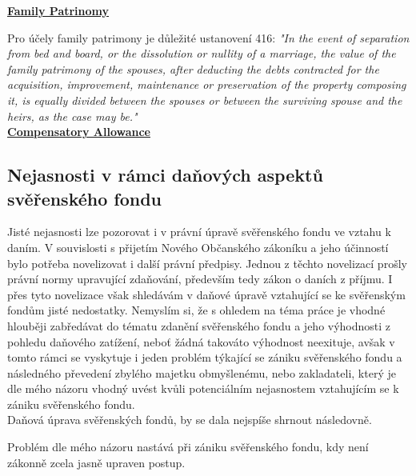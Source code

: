 \documentclass{article}
\begin{document}
\underline{\textbf{Family Patrinomy}}

Pro účely family patrimony je důležité ustanovení 416: \textit{"In the event of separation from bed and board, or the dissolution or nullity of a marriage, the value of the family patrimony of the spouses, after deducting the debts contracted for the acquisition, improvement, maintenance or preservation of the property composing it, is equally divided between the spouses or between the surviving spouse and the heirs, as the case may be."}\\

\underline{\textbf{Compensatory Allowance}}

\subsection{Nejasnosti v rámci daňových aspektů svěřenského fondu}


Jisté nejasnosti lze pozorovat i v právní úpravě svěřenského fondu ve vztahu k daním. V souvislosti s přijetím Nového Občanského zákoníku a jeho účinností bylo potřeba novelizovat i další právní předpisy. Jednou z těchto novelizací prošly právní normy upravující zdaňování, především tedy zákon o daních z příjmu. I přes tyto novelizace však shledávám v daňové úpravě vztahující se ke svěřenským fondům jisté nedostatky. Nemyslím si, že s ohledem na téma práce je vhodné hlouběji zabředávat do tématu zdanění svěřenského fondu a jeho výhodnosti z pohledu daňového zatížení, neboť žádná takováto výhodnost neexituje, avšak v tomto rámci se vyskytuje i jeden problém týkající se zániku svěřenského fondu a následného převedení zbylého majetku obmyšlenému, nebo zakladateli, který je dle mého názoru vhodný uvést kvůli potenciálním nejasnostem vztahujícím se k zániku svěřenského fondu.\\

Daňová úprava svěřenských fondů, by se dala nejspíše shrnout následovně.

Problém dle mého názoru nastává při zániku svěřenského fondu, kdy není zákonně zcela jasně upraven postup.
\end{document}
